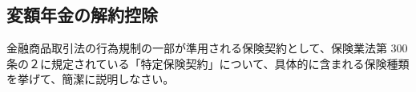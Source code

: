 \documentclass[report,gutter=10mm,fore-edge=10mm,uplatex,dvipdfmx]{jlreq}
\begin{document}

\subsection{変額年金の解約控除}
金融商品取引法の行為規制の一部が準用される保険契約として、保険業法第 300 条の２に規定されている「特定保険契約」について、具体的に含まれる保険種類を挙げて、簡潔に説明しなさい。
\end{document}
